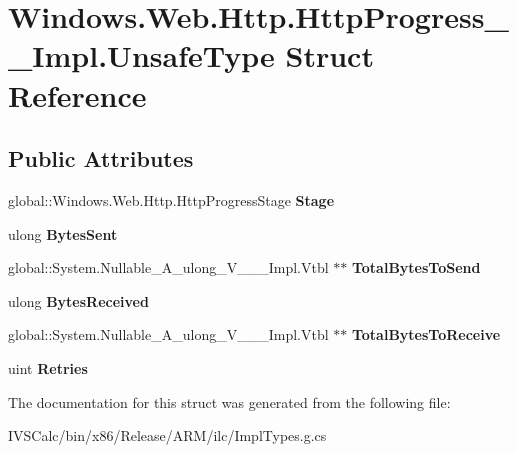\hypertarget{struct_windows_1_1_web_1_1_http_1_1_http_progress_____impl_1_1_unsafe_type}{}\section{Windows.\+Web.\+Http.\+Http\+Progress\+\_\+\+\_\+\+Impl.\+Unsafe\+Type Struct Reference}
\label{struct_windows_1_1_web_1_1_http_1_1_http_progress_____impl_1_1_unsafe_type}
\subsection*{Public Attributes}
\begin{DoxyCompactItemize}
\item 
\mbox{\label{struct_windows_1_1_web_1_1_http_1_1_http_progress_____impl_1_1_unsafe_type_a2810acdf6d618c183e34a612b814cd61}} 
global\+::\+Windows.\+Web.\+Http.\+Http\+Progress\+Stage {\bfseries Stage}
\item 
\mbox{\label{struct_windows_1_1_web_1_1_http_1_1_http_progress_____impl_1_1_unsafe_type_acfe84f8cf288238c929218d3929df7e7}} 
ulong {\bfseries Bytes\+Sent}
\item 
\mbox{\label{struct_windows_1_1_web_1_1_http_1_1_http_progress_____impl_1_1_unsafe_type_a999fa4c3314c338fc1b1e805fa3a6908}} 
global\+::\+System.\+Nullable\+\_\+\+A\+\_\+ulong\+\_\+\+V\+\_\+\+\_\+\+\_\+\+Impl.\+Vtbl $\ast$$\ast$ {\bfseries Total\+Bytes\+To\+Send}
\item 
\mbox{\label{struct_windows_1_1_web_1_1_http_1_1_http_progress_____impl_1_1_unsafe_type_abed3a23eb69efc3b576d3f1237c5c4ec}} 
ulong {\bfseries Bytes\+Received}
\item 
\mbox{\label{struct_windows_1_1_web_1_1_http_1_1_http_progress_____impl_1_1_unsafe_type_aaba57ee9c3456448f4f9435fc4ebb065}} 
global\+::\+System.\+Nullable\+\_\+\+A\+\_\+ulong\+\_\+\+V\+\_\+\+\_\+\+\_\+\+Impl.\+Vtbl $\ast$$\ast$ {\bfseries Total\+Bytes\+To\+Receive}
\item 
\mbox{\label{struct_windows_1_1_web_1_1_http_1_1_http_progress_____impl_1_1_unsafe_type_a8b229758034e1787aa1fbc529ef711c4}} 
uint {\bfseries Retries}
\end{DoxyCompactItemize}


The documentation for this struct was generated from the following file\+:\begin{DoxyCompactItemize}
\item 
I\+V\+S\+Calc/bin/x86/\+Release/\+A\+R\+M/ilc/Impl\+Types.\+g.\+cs\end{DoxyCompactItemize}
